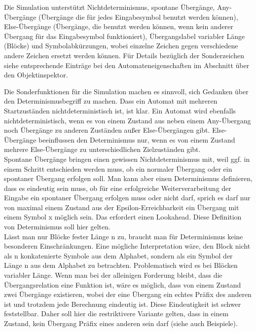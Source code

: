 Die Simulation unterstützt Nichtdeterminismus, spontane Übergänge, Any-Über\-gänge (Übergänge die für jedes Eingabesymbol benutzt werden können), Else-Über\-gänge (Übergänge, die benutzt werden können, wenn kein anderer Übergang für das Eingabesymbol funktioniert), Übergangslabel variabler Länge (Blöcke) und Symbolabkürzungen, wobei einzelne Zeichen gegen verschiedene andere Zeichen ersetzt werden können. Für Details bezüglich der Sonderzeichen siehe entsprechende Einträge bei den Automateneigenschaften im Abschnitt über den Objektinspektor.

\label{Determinismus}
Die Sonderfunktionen für die Simulation machen es sinnvoll, sich Gedanken über den Determinismusbegriff zu machen. Dass ein Automat mit mehreren Startzuständen nichtdeterministisch ist, ist klar. Ein Automat wird ebenfalls nichtdeterministisch, wenn es von einem Zustand aus neben einem Any-Übergang noch Übergänge zu anderen Zuständen außer Else-Übergängen gibt. Else-Übergänge beeinflussen den Determinismus nur, wenn es von einem Zustand mehrere Else-Übergänge zu unterschiedlichen Zielzuständen gibt.\\
Spontane Übergänge bringen einen gewissen Nichtdeterminismus mit, weil ggf. in einem Schritt entschieden werden muss, ob ein normaler Übergang oder ein spontaner Übergang erfolgen soll. Man kann aber einen Determinismus definieren, dass es eindeutig sein muss, ob für eine erfolgreiche Weiterverarbeitung der Eingabe ein spontaner Übergang erfolgen muss oder nicht darf, sprich es darf nur von maximal einem Zustand aus der Epsilon-Erreichbarkeit ein Übergang mit einem Symbol x möglich sein. Das erfordert einen Lookahead. Diese Definition von Determinismus soll hier gelten.\\
Lässt man nur Blöcke fester Länge n zu, braucht man für Determinismus keine besonderen Einschränkungen. Eine mögliche Interpretation wäre, den Block nicht als n konkatenierte Symbole aus dem Alphabet, sondern als ein Symbol der Länge n aus dem Alphabet zu betrachten. Problematisch wird es bei Blöcken variabler Länge. Wenn man bei der alleinigen Forderung bleibt, dass die Übergangsrelation eine Funktion ist, wäre es möglich, dass von einem Zustand zwei Übergänge existieren, wobei der eine Übergang ein echtes Präfix des anderen ist und trotzdem jede Berechnung eindeutig ist. Diese Eindeutigkeit ist schwer feststellbar. Daher soll hier die restriktivere Variante gelten, dass in einem Zustand, kein Übergang Präfix eines anderen sein darf (siehe auch Beispiele).

